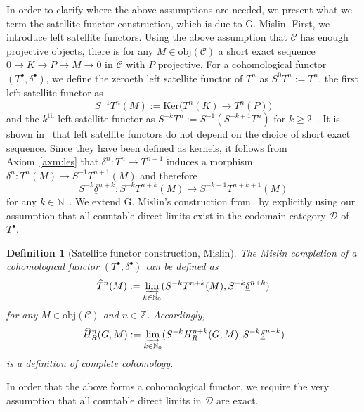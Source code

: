 \documentclass[12pt,a4paper]{article}
\numberwithin{equation}{section}
\newtheorem{defn}[thm]{Definition}
\theoremstyle{nonumberplain}
\begin{document}
In order to clarify where the above assumptions are needed, we present what we term the satellite functor construction, which is due to G.\! Mislin. First, we introduce left satellite functors. Using the above assumption that $\mathcal{C}$ has enough projective objects, there is for any $M \in \mathrm{obj}(\mathcal{C})$ a short exact sequence $0 \rightarrow K \rightarrow P \rightarrow M \rightarrow 0$ in $\mathcal{C}$ with $P$ projective. For a cohomological functor $(T^{\bullet}, \delta^{\bullet})$, we define the zeroeth left satellite functor of $T^n$ as $S^0T^n := T^n$, the first left satellite functor as
\[ S^{-1}T^n(M) := \mathrm{Ker}\big(T^n(K) \rightarrow T^n(P)\big) \]
and the $k^{\text{th}}$ left satellite functor as $S^{-k}T^n := S^{-1}(S^{-k+1}T^n)$ for $k \geq 2$~\cite[p.~36]{car56}. It is shown in~\cite[Section~III.1]{car56} that left satellite functors do not depend on the choice of short exact sequence. Since they have been defined as kernels, it follows from Axiom~\ref{axm:les} that $\delta^n: T^n \rightarrow T^{n+1}$ induces a morphism $\underline{\delta}^n: T^n(M) \rightarrow S^{-1}T^{n+1}(M)$ and therefore
\[ S^{-k}\underline{\delta}^{n+k}: S^{-k}T^{n+k}(M) \rightarrow S^{-k-1}T^{n+k+1}(M) \]
for any $k \in \mathbb{N}$~\cite[p.~207--208]{kro95}. We extend G.\! Mislin's construction from~\cite[p.~293]{mis94} by explicitly using our assumption that all countable  direct limits exist in the codomain category $\mathcal{D}$ of $T^{\bullet}$.

\begin{defn}[Satellite functor construction, Mislin]
The Mislin completion of a cohomological functor $(T^{\bullet}, \delta^{\bullet})$ can be defined as
\[ \widehat{T}^n(M) := \varinjlim_{k \in \mathbb{N}_0} (S^{-k}T^{n+k}(M), S^{-k}\underline{\delta}^{n+k}) \]
for any $M \in \mathrm{obj}(\mathcal{C})$ and $n \in \mathbb{Z}$. Accordingly,
\[ \widehat{H}_R^n(G, M) := \varinjlim_{k \in \mathbb{N}_0} (S^{-k}H_R^{n+k}(G, M), S^{-k}\underline{\delta}^{n+k}) \]
is a definition of complete cohomology.
\end{defn}

In order that the above forms a cohomological functor, we require the very assumption that all countable direct limits in $\mathcal{D}$ are exact. \\
\end{document}
